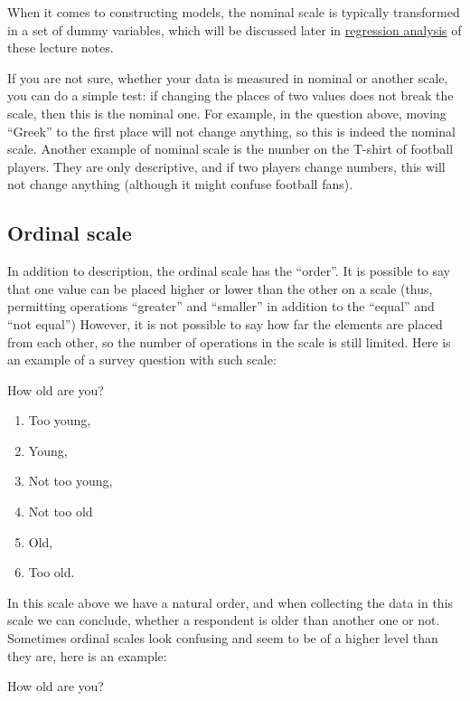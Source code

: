 \documentclass[
]{book}
\providecommand{\tightlist}{%
  \setlength{\itemsep}{0pt}\setlength{\parskip}{0pt}}
\theoremstyle{definition}
\theoremstyle{definition}
\theoremstyle{definition}
\theoremstyle{definition}
\theoremstyle{remark}
\begin{document}
When it comes to constructing models, the nominal scale is typically transformed in a set of dummy variables, which will be discussed later in \protect\hyperlink{regression}{regression analysis} of these lecture notes.

If you are not sure, whether your data is measured in nominal or another scale, you can do a simple test: if changing the places of two values does not break the scale, then this is the nominal one. For example, in the question above, moving ``Greek'' to the first place will not change anything, so this is indeed the nominal scale. Another example of nominal scale is the number on the T-shirt of football players. They are only descriptive, and if two players change numbers, this will not change anything (although it might confuse football fans).

\hypertarget{ordinal-scale}{%
\subsection{Ordinal scale}\label{ordinal-scale}}

In addition to description, the ordinal scale has the ``order''. It is possible to say that one value can be placed higher or lower than the other on a scale (thus, permitting operations ``greater'' and ``smaller'' in addition to the ``equal'' and ``not equal'') However, it is not possible to say how far the elements are placed from each other, so the number of operations in the scale is still limited. Here is an example of a survey question with such scale:

How old are you?

\begin{enumerate}
\def\labelenumi{\arabic{enumi}.}
\tightlist
\item
  Too young,
\item
  Young,
\item
  Not too young,
\item
  Not too old
\item
  Old,
\item
  Too old.
\end{enumerate}

In this scale above we have a natural order, and when collecting the data in this scale we can conclude, whether a respondent is older than another one or not. Sometimes ordinal scales look confusing and seem to be of a higher level than they are, here is an example:

How old are you?
\end{document}
